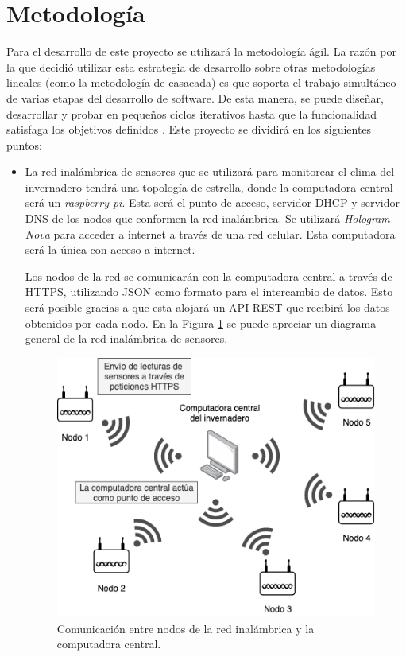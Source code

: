 \section{Metodología}

Para el desarrollo de este proyecto se utilizará la metodología ágil. La razón por la que decidió utilizar esta estrategia de desarrollo sobre otras metodologías lineales (como la metodología de casacada) es que soporta el trabajo simultáneo de varias etapas del desarrollo de software. De esta manera, se puede diseñar, desarrollar y probar en pequeños ciclos iterativos hasta que la funcionalidad satisfaga los objetivos definidos \cite{what_is_agile_meth}. Este proyecto se dividirá en los siguientes puntos:

\begin{itemize}
	
	\item La red inalámbrica de sensores que se utilizará para monitorear el clima del invernadero tendrá una topología de estrella, donde la computadora central será un \textit{raspberry pi}. Esta será el punto de acceso, servidor DHCP y servidor DNS de los nodos que conformen la red inalámbrica. Se utilizará \textit{Hologram Nova} para acceder a internet a través de una red celular. Esta computadora será la única con acceso a internet.

	Los nodos de la red se comunicarán con la computadora central a través de HTTPS, utilizando JSON como formato para el intercambio de datos. Esto será posible gracias a que esta alojará un API REST que recibirá los datos obtenidos por cada nodo. En la Figura \ref{fig:coms_nodos_raspberry} se puede apreciar un diagrama general de la red inalámbrica de sensores.

	\begin{figure}[!ht]
		\centering
		\includegraphics[width=.60\linewidth]{imagenes/diagramas/comunicacion_nodos_raspberry.png}
		\caption{Comunicación entre nodos de la red inalámbrica y la computadora central.}
		\label{fig:coms_nodos_raspberry}
	\end{figure}


\end{itemize}
